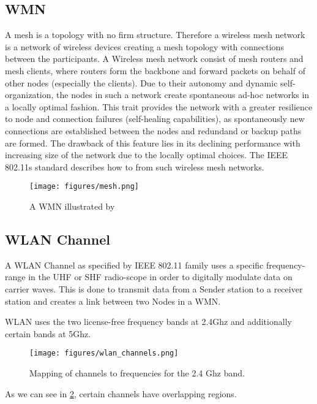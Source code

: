  \subsection{\ac{WMN}}
    A mesh is a topology with no firm structure. Therefore a wireless mesh network is a network of wireless devices creating a mesh topology with connections between the participants.
    A Wireless mesh network consist of mesh routers and mesh clients, where routers form the backbone and forward packets on behalf of other nodes (especially the clients).
    Due to their autonomy and dynamic self-organization, the nodes in such a network create spontaneous ad-hoc networks in a locally optimal fashion.
    This trait provides the network with a greater resilience to node and connection failures (self-healing capabilities), 
    as spontaneously new connections are established between the nodes and redundand or backup paths are formed. 
    The drawback of this feature lies in its declining performance with increasing size of the network due to the locally optimal choices.
    The IEEE 802.11s standard describes how to from such wireless mesh networks. \cite{GRH_WLANMeshStandard_IEEEWiCom2010} 
    \begin{figure}[t]
      \centering
      \texttt{[image: figures/mesh.png]}
      \caption{A \ac{WMN} illustrated by \cite{Akyildiz2005445}}
      \label{fig:mesh}
    \end{figure}
    
  \subsection{\ac{WLAN} Channel}
    A \ac{WLAN} Channel as specified by IEEE 802.11 family uses a specific frequency-range in the \ac{UHF} or \ac{SHF} radio-scope in order to digitally modulate data on carrier waves.
    This is done to transmit data from a Sender station to a receiver station and creates a link between two Nodes in a \ac{WMN}. 
    
    \ac{WLAN} uses the two license-free frequency bands at 2.4Ghz and additionally certain bands at 5Ghz.
    \begin{figure}[t]
      \centering
      \texttt{[image: figures/wlan\_channels.png]}
      \caption{Mapping of channels to frequencies for the 2.4 Ghz band. \cite{wlan_channels}}
      \label{fig:wlan_channels}
    \end{figure}
    As we can see in \ref{fig:wlan_channels}, certain channels have overlapping regions.
    
